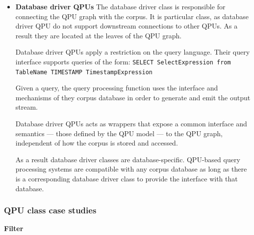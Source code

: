 \begin{itemize}
\begin{itemize}
    \end{itemize}

  \item \textbf{Database driver QPUs}
  The database driver class is responsible for connecting the QPU graph with the corpus.
  It is particular class, as database driver QPU do not support downstream connections to other QPUs.
  As a result they are located at the leaves of the QPU graph.

  Database driver QPUs apply a restriction on the query language.
  Their query interface supports queries of the form:
  {\obeylines\obeyspaces
  \texttt{SELECT SelectExpression from TableName TIMESTAMP TimestampExpression}}

  Given a query, the query processing function uses the interface and mechanisms of they corpus database in order to generate and emit
  the output stream.

  Database driver QPUs acts as wrappers that expose a common interface and semantics --- those defined by the QPU model --- to the
  QPU graph, independent of how the corpus is stored and accessed.

  As a result database driver classes are database-specific.
  QPU-based query processing systems are compatible with any corpus database as long as there is a corresponding database driver class
  to provide the interface with that database.
\end{itemize}

\subsubsection{QPU class case studies}

\textbf{Filter}





